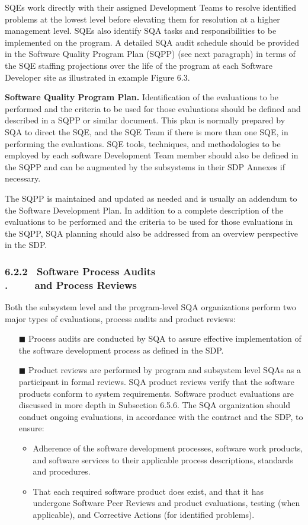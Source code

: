 \documentclass[10pt,twocolumn]{article}
\begin{document}
SQEs work directly with their assigned Development
Teams to resolve identified problems at the lowest level
before elevating them for resolution at a higher management
level. SQEs also identify SQA tasks and responsibilities to be
implemented on the program. A detailed SQA audit schedule
should be provided in the Software Quality Program Plan
(SQPP) (see next paragraph) in terms of the SQE staffing
projections over the life of the program at each Software
Developer site as illustrated in example Figure 6.3.



\textbf{Software Quality Program Plan. }Identification of the
evaluations to be performed and the criteria to be used for
those evaluations should be defined and described in a SQPP
or similar document. This plan is normally prepared by SQA
to direct the SQE, and the SQE Team if there is more than
one SQE, in performing the evaluations. SQE tools, techniques,
 and methodologies to be employed by each software
Development Team member should also be defined in the
SQPP and can be augmented by the subsystems in their SDP
Annexes if necessary.

The SQPP is maintained and updated as needed and is
usually an addendum to the Software Development Plan. In
addition to a complete description of the evaluations to be
performed and the criteria to be used for those evaluations in
the SQPP, SQA planning should also be addressed from an
overview perspective in the SDP.


\subsubsection*{6.2.2 $\,$ Software Process Audits\\{\color{white}.} $\qquad$ and Process Reviews}
Both the subsystem level and the program-level SQA organizations perform two major types of evaluations, process
audits and product reviews:
\begin{itemize}
	\item [$\blacksquare$]
	Process audits are conducted by SQA to assure effective
	implementation of the software development process
	as defined in the SDP.
	\item [$\blacksquare$]
	Product reviews are performed by program and subsystem level SQAs as a participant in formal reviews.
	SQA product reviews verify that the software products
	conform to system requirements. Software product
	evaluations are discussed in more depth in Subsection
	6.5.6. The SQA organization should conduct ongoing
	evaluations, in accordance with the contract and the
	SDP, to ensure:
\begin{itemize}
	\item 
	Adherence of the software development processes,
	software work products, and software services to
	their applicable process descriptions, standards and
	procedures.
	\item
	That each required software product does exist, and
	that it has undergone Software Peer Reviews and
	product evaluations, testing (when applicable),
	and Corrective Actions (for identified problems).
\end{itemize}
\end{itemize}
\end{document}
